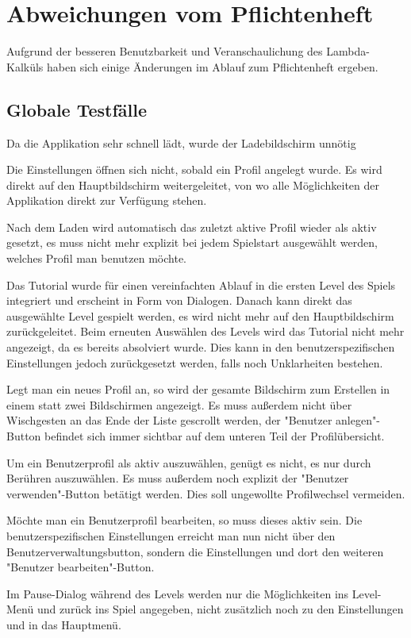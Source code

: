 \documentclass[parskip=full]{scrreprt}
\begin{document}
\chapter{Abweichungen vom Pflichtenheft}
Aufgrund der besseren Benutzbarkeit und Veranschaulichung des Lambda-Kalküls haben sich einige Änderungen im Ablauf zum Pflichtenheft ergeben.

\section{Globale Testfälle}
\begin{description}
	\item Da die Applikation sehr schnell lädt, wurde der Ladebildschirm unnötig
	\item Die Einstellungen öffnen sich nicht, sobald ein Profil angelegt wurde. Es wird direkt auf den Hauptbildschirm weitergeleitet, von wo alle Möglichkeiten der Applikation direkt zur Verfügung stehen.
	\item Nach dem Laden wird automatisch das zuletzt aktive Profil wieder als aktiv gesetzt, es muss nicht mehr explizit bei jedem Spielstart ausgewählt werden, welches Profil man benutzen möchte.
	\item Das Tutorial wurde für einen vereinfachten Ablauf in die ersten Level des Spiels integriert und erscheint in Form von Dialogen. Danach kann direkt das ausgewählte Level gespielt werden, es wird nicht mehr auf den Hauptbildschirm zurückgeleitet. Beim erneuten Auswählen des Levels wird das Tutorial nicht mehr angezeigt, da es bereits absolviert wurde. Dies kann in den benutzerspezifischen Einstellungen jedoch zurückgesetzt werden, falls noch Unklarheiten bestehen.
	\item Legt man ein neues Profil an, so wird der gesamte Bildschirm zum Erstellen in einem statt zwei Bildschirmen angezeigt. Es muss außerdem nicht über Wischgesten an das Ende der Liste gescrollt werden, der "Benutzer anlegen"-Button befindet sich immer sichtbar auf dem unteren Teil der Profilübersicht.
	\item Um ein Benutzerprofil als aktiv auszuwählen, genügt es nicht, es nur durch Berühren auszuwählen. Es muss außerdem noch explizit der "Benutzer verwenden"-Button betätigt werden. Dies soll ungewollte Profilwechsel vermeiden.
	\item Möchte man ein Benutzerprofil bearbeiten, so muss dieses aktiv sein. Die benutzerspezifischen Einstellungen erreicht man nun nicht über den Benutzerverwaltungsbutton, sondern die Einstellungen und dort den weiteren "Benutzer bearbeiten"-Button.
	\item Im Pause-Dialog während des Levels werden nur die Möglichkeiten ins Level-Menü und zurück ins Spiel angegeben, nicht zusätzlich noch zu den Einstellungen und in das Hauptmenü.
\end{description}
\end{document}
